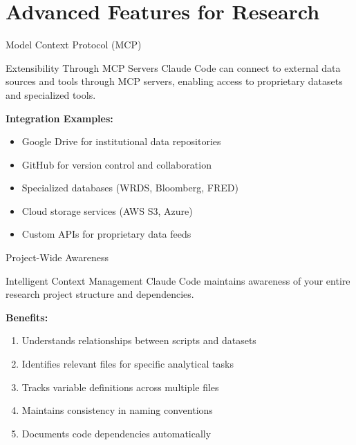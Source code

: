 \documentclass[9pt]{beamer}
\begin{document}
	\section{Advanced Features for Research}
	
	\begin{frame}{Model Context Protocol (MCP)}
		\begin{alertblock}{Extensibility Through MCP Servers}
			Claude Code can connect to external data sources and tools through MCP servers, enabling access to proprietary datasets and specialized tools.
		\end{alertblock}
		
		\vspace{0.5cm}
		
		\textbf{Integration Examples:}
		\begin{itemize}
			\item Google Drive for institutional data repositories
			\item GitHub for version control and collaboration
			\item Specialized databases (WRDS, Bloomberg, FRED)
			\item Cloud storage services (AWS S3, Azure)
			\item Custom APIs for proprietary data feeds
		\end{itemize}
	\end{frame}
	
	\begin{frame}{Project-Wide Awareness}
		\begin{block}{Intelligent Context Management}
			Claude Code maintains awareness of your entire research project structure and dependencies.
		\end{block}
		
		\vspace{0.5cm}
		
		\textbf{Benefits:}
		\begin{enumerate}
			\item Understands relationships between scripts and datasets
			\item Identifies relevant files for specific analytical tasks
			\item Tracks variable definitions across multiple files
			\item Maintains consistency in naming conventions
			\item Documents code dependencies automatically
		\end{enumerate}
	\end{frame}
	
\end{document}
